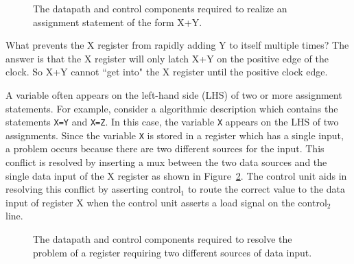 \begin{description}
\begin{figure}[ht]
\caption{The datapath and control components required to realize
an assignment statement of the form X+Y.}
\label{fig:Op}
\end{figure}

What prevents the X register from rapidly adding Y to itself 
multiple times?  The answer is that the X register will 
only latch X+Y on the positive edge of the clock.  So 
X+Y cannot ``get into" the X register until the positive 
clock edge.

A variable often appears on the left-hand side (LHS) 
of two or more assignment statements.  For example, consider a
algorithmic description which contains the statements \verb+X=Y+ 
and \verb+X=Z+.  In this case, the variable \verb^X^ appears on the LHS
of two assignments.  Since the variable \verb^X^ is stored in a register
which has a single input, a problem occurs because there are two 
different sources for the input.  This conflict is resolved by
inserting a mux between the two data sources and the single
data input of the X register as shown in Figure~\ref{fig:2Source}.
The control unit aids in resolving this conflict by asserting 
control$_1$ to route the correct value to the data input of 
register X when the control unit asserts a load signal on the 
control$_2$ line.

\begin{figure}[ht]
\caption{The datapath and control components required to resolve
the problem of a register requiring two different sources of
data input.}
\label{fig:2Source}
\end{figure}

\end{description}

